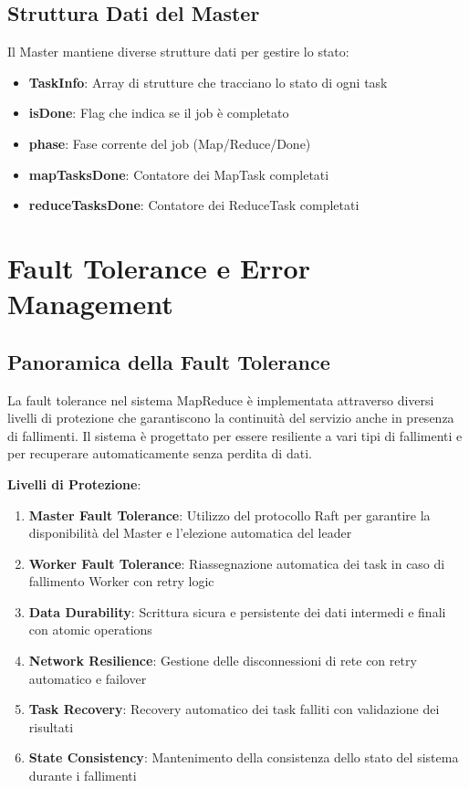 \documentclass[12pt,a4paper]{article}
\begin{document}
\subsection{Struttura Dati del Master}

Il Master mantiene diverse strutture dati per gestire lo stato:

\begin{itemize}
\item \textbf{TaskInfo}: Array di strutture che tracciano lo stato di ogni task
\item \textbf{isDone}: Flag che indica se il job è completato
\item \textbf{phase}: Fase corrente del job (Map/Reduce/Done)
\item \textbf{mapTasksDone}: Contatore dei MapTask completati
\item \textbf{reduceTasksDone}: Contatore dei ReduceTask completati
\end{itemize}

\section{Fault Tolerance e Error Management}

\subsection{Panoramica della Fault Tolerance}

La fault tolerance nel sistema MapReduce è implementata attraverso diversi livelli di protezione che garantiscono la continuità del servizio anche in presenza di fallimenti. Il sistema è progettato per essere resiliente a vari tipi di fallimenti e per recuperare automaticamente senza perdita di dati.

\textbf{Livelli di Protezione}:

\begin{enumerate}
\item \textbf{Master Fault Tolerance}: Utilizzo del protocollo Raft per garantire la disponibilità del Master e l'elezione automatica del leader
\item \textbf{Worker Fault Tolerance}: Riassegnazione automatica dei task in caso di fallimento Worker con retry logic
\item \textbf{Data Durability}: Scrittura sicura e persistente dei dati intermedi e finali con atomic operations
\item \textbf{Network Resilience}: Gestione delle disconnessioni di rete con retry automatico e failover
\item \textbf{Task Recovery}: Recovery automatico dei task falliti con validazione dei risultati
\item \textbf{State Consistency}: Mantenimento della consistenza dello stato del sistema durante i fallimenti
\end{enumerate}
\end{document}
